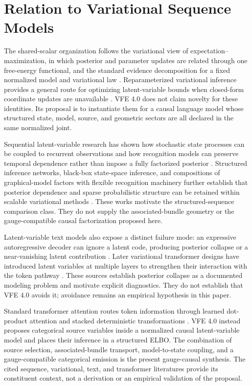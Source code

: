 \chapter{Relation to Variational Sequence Models}

The shared-scalar organization follows the variational view of expectation--maximization, in which posterior and parameter updates are related through one free-energy functional, and the standard evidence decomposition for a fixed normalized model and variational law \citep{Neal1998,Wainwright2008}. Reparameterized variational inference provides a general route for optimizing latent-variable bounds when closed-form coordinate updates are unavailable \citep{Kingma2013}. VFE 4.0 does not claim novelty for these identities. Its proposal is to instantiate them for a causal language model whose structured state, model, source, and geometric sectors are all declared in the same normalized joint.

Sequential latent-variable research has shown how stochastic state processes can be coupled to recurrent observations and how recognition models can preserve temporal dependence rather than impose a fully factorized posterior \citep{chung2015recurrent,fraccaro2016sequential}. Structured inference networks, black-box state-space inference, and compositions of graphical-model factors with flexible recognition machinery further establish that posterior dependence and sparse probabilistic structure can be retained within scalable variational methods \citep{krishnan2017structured,archer2015black,johnson2016composing}. These works motivate the structured-sequence comparison class. They do not supply the associated-bundle geometry or the gauge-compatible causal factorization proposed here.

Latent-variable text models also expose a distinct failure mode: an expressive autoregressive decoder can ignore a latent code, producing posterior collapse or a near-vanishing latent contribution \citep{bowman2016generating}. Later variational transformer designs have introduced latent variables at multiple layers to strengthen their interaction with the token pathway \citep{hu2022fuse}. These sources establish posterior collapse as a documented modeling problem and motivate explicit diagnostics. They do not establish that VFE 4.0 avoids it; avoidance remains an empirical hypothesis in this paper.

Standard transformer attention routes token information through learned dot-product attention and stacked deterministic transformations \citep{Vaswani2017}. VFE 4.0 instead proposes categorical source variables inside a normalized causal latent-variable model and places their inference in a structured ELBO. The combination of source selection, associated-bundle transport, model-to-state coupling, and a gauge-compatible categorical emission is the present gauge-causal synthesis. The cited sequence, variational, text, and transformer literatures provide its constituent context, not a derivation or an empirical validation of the proposal.
